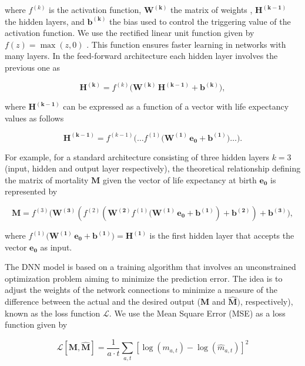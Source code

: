 \documentclass[a4,11pt]{article}
\begin{document}
where $f^{(k)}$ is the activation function, $\mathbf{W^{(k)}}$ the matrix of weights , $\mathbf{H^{(k-1)}}$ the hidden layers, and $\mathbf{b^{(k)}}$ the bias used to control the triggering value of the activation function. We use the rectified linear unit function given by $f(z)= \max(z, 0)$ \citep{Glorot}. This function ensures faster learning in networks with many layers. In the feed-forward architecture each hidden layer involves the previous one as

%
\begin{equation*}
\mathbf{H^{(k)}}=f^{(k)}\big(\mathbf{W^{(k)}}\,\mathbf{H^{(k-1)}}+\mathbf{b^{(k)}}\big),
\end{equation*}
%

where $\mathbf{H^{(k-1)}}$ can be expressed as a function of a vector with life expectancy values as follows

%
\begin{equation*}
\mathbf{H^{(k-1)}} = f^{(k-1)} \big(\dots f^{(1)}\big(\mathbf{W^{(1)}}\,\mathbf{e_{0}}+\mathbf{b^{(1)}}\big)\dots\big).
\end{equation*}
%

For example, for a standard architecture consisting of three hidden layers $k=3$ (input, hidden and output layer respectively), the theoretical relationship defining the matrix of mortality $\mathbf{M}$ given the vector of life expectancy at birth $\mathbf{e_{0}}$ is represented by

%
\begin{equation}
\label{eq:2}
\mathbf{M}= f^{(3)} \big(\mathbf{W^{(3)}}(f^{(2)}(\mathbf{W^{(2)}}f^{(1)}\big(\mathbf{W^{(1)}}\,\mathbf{e_{0}}+\mathbf{b^{(1)}})+\mathbf{b^{(2)}})+\mathbf{b^{(3)}}),
\end{equation}
%

where $f^{(1)}\big(\mathbf{W^{(1)}}\,\mathbf{e_{0}}+\mathbf{b^{(1)}}\big) = \mathbf{H^{(1)}}$ is the first hidden layer that accepts the vector $\mathbf{e_{0}}$ as input. 

The DNN model is based on a training algorithm that involves an unconstrained optimization problem aiming to minimize the prediction error. The idea is to adjust the weights of the network connections to minimize a measure of the difference between the actual and the desired output ($\mathbf{M}$ and $\mathbf{\hat{M}})$, respectively), known as the loss function $\mathcal{L}$. We use the Mean Square Error (MSE) as a loss function given by

%
$$\mathcal{L}[\mathbf{M},\mathbf{\hat{M}}] = \frac{1}{a \cdot t}\sum_{a,t}\left[\log({m_{a,t}})- \log({\hat{m}_{a,t}})\right]^2$$
%
\end{document}
